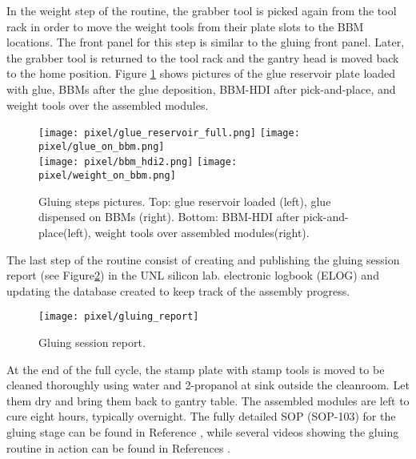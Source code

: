 In the weight step of the routine, the grabber tool is picked again from the tool rack in order to move the weight tools from their plate slots to the BBM locations. The front panel for this step is similar to the gluing front panel. Later, the grabber tool is returned to the tool rack and the gantry head is moved back to the home position. Figure \ref{fig:gluing_steps} shows pictures of the glue reservoir plate loaded with glue, BBMs after the glue deposition, BBM-HDI after pick-and-place, and weight tools over the assembled modules. 

\begin{figure}[h]
\begin{center}
  \texttt{[image: pixel/glue\_reservoir\_full.png]}
  \texttt{[image: pixel/glue\_on\_bbm.png]}\\
  \texttt{[image: pixel/bbm\_hdi2.png]}
  \texttt{[image: pixel/weight\_on\_bbm.png]}
  \caption[Gluing steps pictures.]{Gluing steps pictures. Top: glue reservoir loaded (left), glue dispensed on BBMs (right). Bottom: BBM-HDI after pick-and-place(left), weight tools over assembled modules(right).}\label{fig:gluing_steps}
\end{center}
\end{figure}

The last step of the routine consist of creating and publishing the gluing session report (see Figure\ref{fig:gluing_report}) in the UNL silicon lab. electronic logbook (ELOG) and updating the database created to keep track of the assembly progress.  

\begin{figure}[h]
\begin{center}
  \texttt{[image: pixel/gluing\_report]}
 \caption[Gluing session report.]{Gluing session report.}\label{fig:gluing_report}
\end{center}
\end{figure}

At the end of the full cycle, the stamp plate with stamp tools is moved to be cleaned thoroughly using water and 2-propanol at sink outside the cleanroom. Let them dry and bring them back to gantry table. The assembled modules are left to cure eight hours, typically overnight. The fully detailed SOP (SOP-103) for the gluing stage can be found in Reference \cite{sop_103}, while several videos showing the gluing routine in action can be found in References \cite{gluing_frank, jmonroy_channel}. 


